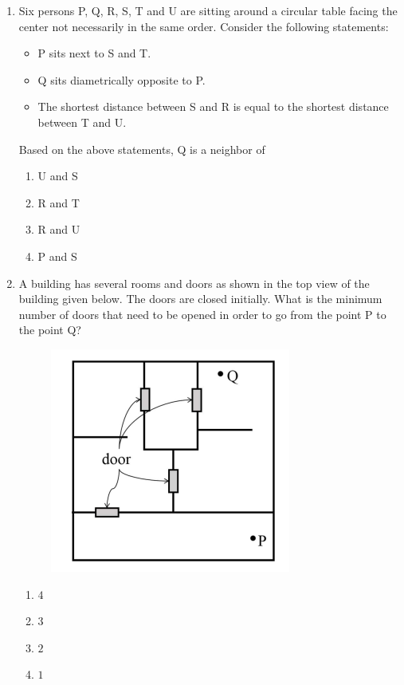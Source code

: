 \documentclass[journal,12pt,onecolumn]{IEEEtran}
\theoremstyle{remark}
\begin{document}
\begin{enumerate}
\item Six persons P, Q, R, S, T and U are sitting around a circular table facing the center not necessarily in the same order. Consider the following statements:
\begin{itemize}
\item P sits next to S and T.
\item Q sits diametrically opposite to P.
\item The shortest distance between S and R is equal to the shortest distance between T and U.
\end{itemize}
Based on the above statements, Q is a neighbor of

\hfill{}
\begin{enumerate}
\item U and S
\item R and T
\item R and U
\item P and S
\end{enumerate}

\item A building has several rooms and doors as shown in the top view of the building given below. The doors are closed initially. What is the minimum number of doors that need to be opened in order to go from the point P to the point Q?

\hfill{}
\begin{figure}[H]
\includegraphics[width = 0.5\columnwidth]{q5}
\caption*{}
\label{fig:q5}
\end{figure}
\begin{enumerate}
\item $4$
\item $3$
\item $2$
\item $1$
\end{enumerate}


\end{enumerate}
\end{document}
